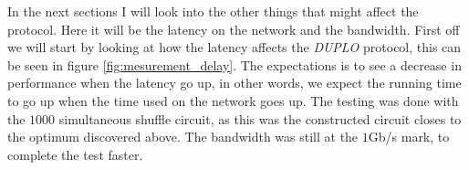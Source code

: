\documentclass[twoside,11pt,openright]{report}
\newcommand{\DUPLO}{\textit{DUPLO} }
\begin{document}
\bigskip

In the next sections I will look into the other things that might affect the protocol. Here it will be the latency on the network and the bandwidth. First off we will start by looking at how the latency affects the \DUPLO protocol, this can be seen in figure \ref{fig:mesurement_delay}. The expectations is to see a decrease in performance when the latency go up, in other words, we expect the running time to go up when the time used on the network goes up. The testing was done with the $1000$ simultaneous shuffle circuit, as this was the constructed circuit closes to the optimum discovered above. The bandwidth was still at the $1$Gb/s mark, to complete the test faster.

\bigskip

\begin{figure}
    \centering

    \begin{subfigure}{\textwidth}
        \centering
        \caption{}
        \label{fig:const_delay_plot}
    \end{subfigure}

    \vspace*{0cm}

    \begin{subfigure}{\textwidth}
        \centering
        \caption{}
        \label{fig:eval_delay_plot}
    \end{subfigure}


\end{figure}
\end{document}
